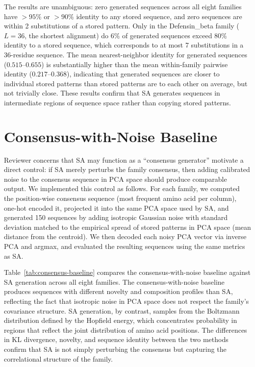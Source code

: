 The results are unambiguous: zero generated sequences across all eight families have $>95\%$ or $>90\%$ identity to any stored sequence, and zero sequences are within 2 substitutions of a stored pattern. Only in the Defensin\_beta family ($L{=}36$, the shortest alignment) do $6\%$ of generated sequences exceed $80\%$ identity to a stored sequence, which corresponds to at most 7 substitutions in a 36-residue sequence. The mean nearest-neighbor identity for generated sequences ($0.515$--$0.655$) is substantially higher than the mean within-family pairwise identity ($0.217$--$0.368$), indicating that generated sequences are closer to individual stored patterns than stored patterns are to each other on average, but not trivially close. These results confirm that SA generates sequences in intermediate regions of sequence space rather than copying stored patterns.

\section{Consensus-with-Noise Baseline}\label{si:consensus-baseline}

Reviewer concerns that SA may function as a ``consensus generator'' motivate a direct control: if SA merely perturbs the family consensus, then adding calibrated noise to the consensus sequence in PCA space should produce comparable output. We implemented this control as follows. For each family, we computed the position-wise consensus sequence (most frequent amino acid per column), one-hot encoded it, projected it into the same PCA space used by SA, and generated 150 sequences by adding isotropic Gaussian noise with standard deviation matched to the empirical spread of stored patterns in PCA space (mean distance from the centroid). We then decoded each noisy PCA vector via inverse PCA and argmax, and evaluated the resulting sequences using the same metrics as SA.

Table~\ref{tab:consensus-baseline} compares the consensus-with-noise baseline against SA generation across all eight families. The consensus-with-noise baseline produces sequences with different novelty and composition profiles than SA, reflecting the fact that isotropic noise in PCA space does not respect the family's covariance structure. SA generation, by contrast, samples from the Boltzmann distribution defined by the Hopfield energy, which concentrates probability in regions that reflect the joint distribution of amino acid positions. The differences in KL divergence, novelty, and sequence identity between the two methods confirm that SA is not simply perturbing the consensus but capturing the correlational structure of the family.

